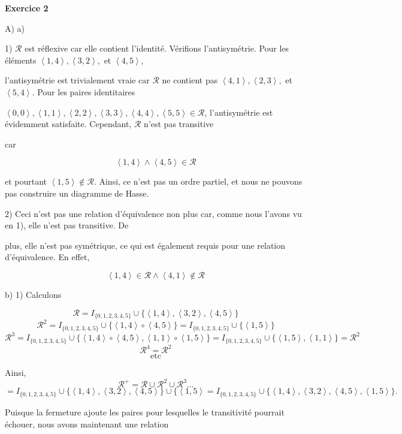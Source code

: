 \documentclass{article}
\newcommand{\tuple}[1]{\ensuremath{\left\langle #1 \right\rangle}}
\begin{document}
    
\textbf{Exercice 2}

\vspace{0.3cm}
A) a) 

1) $\mathcal{R}$ est réflexive car elle contient l'identité. Vérifions l'antisymétrie. Pour les éléments $\tuple{1,4}, \tuple{3,2},$ et $\tuple{4,5}$, 

l'antisymétrie est trivialement vraie car $\mathcal{R}$ ne contient pas $\tuple{4,1}, \tuple{2,3},$ et $\tuple{5,4}$. Pour les paires identitaires 

$\tuple{0, 0},\tuple{1, 1}, \tuple{2, 2}, \tuple{3, 3}, \tuple{4, 4}, \tuple{5, 5} \in \mathcal{R}$, l'antisymétrie est évidemment satisfaite. Cependant, $\mathcal{R}$ n'est pas transitive 

car 

$$ \tuple{1,4} \land \tuple{4,5} \in \mathcal{R}$$

et pourtant $ \tuple{1,5} \notin \mathcal{R}.$ Ainsi, ce n'est pas un ordre partiel, et nous ne pouvons pas construire un diagramme de Hasse.

\vspace{0.3cm}

2)
Ceci n'est pas une relation d'équivalence non plus car, comme nous l'avons vu en 1), elle n'est pas transitive. De 

plus, elle n'est pas symétrique, ce qui est également requis pour une relation d'équivalence. En effet,

$$ \tuple{1,4} \in \mathcal{R} \land \tuple{4,1} \notin \mathcal{R}$$

\vspace{0.3cm}

b) 1) Calculons 

$$ \mathcal{R} = I_{\{0,1,2,3,4,5\}} \cup \{ \tuple{1,4},\tuple{3,2},\tuple{4,5} \}$$
$$\mathcal{R}^2 = I_{\{0,1,2,3,4,5\}} \cup\{ \tuple{1,4} \circ \tuple{4,5} \} = I_{\{0,1,2,3,4,5\}} \cup \{ \tuple{1,5} \}$$
$$\mathcal{R}^3 =  I_{\{0,1,2,3,4,5\}} \cup\{ \tuple{1,4} \circ \tuple{4,5}, \tuple{1,1} \circ \tuple{1,5} \} = I_{\{0,1,2,3,4,5\}} \cup\{ \tuple{1,5} ,\tuple{1,1} \}= \mathcal{R}^2$$
$$\mathcal{R}^4 =  \mathcal{R}^2$$
$$\text{etc}$$

Ainsi, $$ \mathcal{R}^+ = \mathcal{R} \cup \mathcal{R}^2 \cup \mathcal{R}^3 ...$$
$$ = I_{\{0,1,2,3,4,5\}} \cup \{ \tuple{1,4},\tuple{3,2},\tuple{4,5} \} \cup \{ \tuple{1,5} = I_{\{0,1,2,3,4,5\}} \cup \{ \tuple{1,4},\tuple{3,2},\tuple{4,5} , \tuple{1,5}\}.$$

Puisque la fermeture ajoute les paires pour lesquelles le transitivité pourrait échouer, nous avons maintenant une relation
\end{document}
